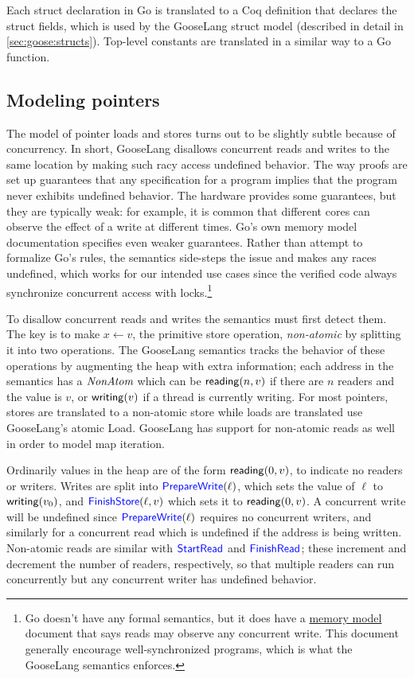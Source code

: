 Each struct declaration in Go is translated to a Coq definition that declares
the struct fields, which is used by the GooseLang struct model (described in
detail in \cref{sec:goose:structs}). Top-level constants are translated in a
similar way to a Go function.

\subsection{Modeling pointers}%
\label{sec:goose:pointers}

The model of pointer loads and stores turns out to be slightly subtle because of
concurrency. In
short, GooseLang disallows concurrent reads and writes to the same
location by making such racy access undefined behavior. The way proofs are set
up guarantees that any
specification for a program implies that the
program never exhibits undefined behavior. The hardware provides some
guarantees, but they are typically weak: for example, it is common that
different cores can observe the effect of a write at different times. Go's own
memory model documentation specifies even weaker guarantees.  Rather than
attempt to formalize Go's rules, the semantics side-steps the issue and makes
any races undefined, which works for our intended use cases since the verified
code always synchronize concurrent access with locks.\footnote{Go doesn't have
any formal semantics, but it does have a \href{https://go.dev/ref/mem}{memory
model} document that says reads may observe any concurrent write. This document
generally encourage well-synchronized programs, which is what the GooseLang
semantics enforces.}

To disallow concurrent reads and writes the semantics must first detect them. The key is to make
$x \gets v$, the primitive store operation, \emph{non-atomic} by splitting it
into two operations. The GooseLang semantics tracks the behavior of these
operations by augmenting the heap with extra information; each address in the
semantics has a $\textit{NonAtom}$ which can be
$\mathsf{reading}(n, v)$ if there are $n$ readers and the value is $v$,
or $\mathsf{writing}(v)$ if a thread is currently writing. For most
pointers, stores are translated to a non-atomic store while loads are translated
use GooseLang's atomic Load. GooseLang has support for non-atomic
reads as well in order to model map iteration.

Ordinarily values in the heap are of the form $\mathsf{reading}(0, v)$,
to indicate no readers or writers. Writes are split into
$\mathsf{\textcolor{blue}{PrepareWrite}}(\ell)$, which sets the value of $\ell$ to
$\mathsf{writing}(v_{0})$, and $\mathsf{\textcolor{blue}{FinishStore}}(\ell, v)$ which sets
it to $\mathsf{reading}(0, v)$. A concurrent write will be undefined
since $\mathsf{\textcolor{blue}{PrepareWrite}}(\ell)$ requires no concurrent writers, and
similarly for a concurrent read which is undefined if the address is being
written. Non-atomic reads are similar with $\mathsf{\textcolor{blue}{StartRead}}$ and
$\mathsf{\textcolor{blue}{FinishRead}}$; these increment and decrement the number of readers,
respectively, so that multiple readers can run concurrently but any concurrent
writer has undefined behavior.

